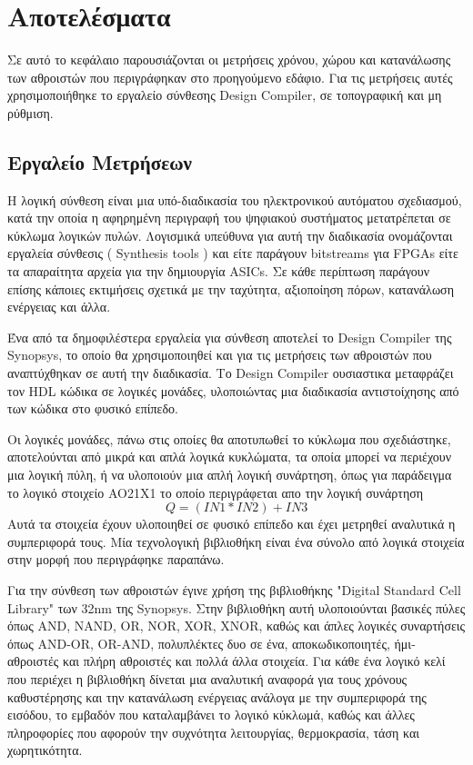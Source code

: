 \section{Αποτελέσματα}

Σε αυτό το κεφάλαιο παρουσιάζονται οι μετρήσεις χρόνου, χώρου και κατανάλωσης των αθροιστών 
που περιγράφηκαν στο προηγούμενο εδάφιο. Για τις μετρήσεις αυτές χρησιμοποιήθηκε το εργαλείο
σύνθεσης Design Compiler, σε τοπογραφική και μη ρύθμιση.


\subsection{Εργαλείο Μετρήσεων}

Η λογική σύνθεση είναι μια υπό-διαδικασία του ηλεκτρονικού αυτόματου σχεδιασμού,
κατά την οποία η αφηρημένη περιγραφή του ψηφιακού συστήματος 
μετατρέπεται σε κύκλωμα λογικών πυλών. Λογισμικά υπεύθυνα για αυτή την διαδικασία
ονομάζονται εργαλεία σύνθεσις ( Synthesis tools ) και είτε παράγουν bitstreams για FPGAs
είτε τα απαραίτητα αρχεία για την δημιουργία ASICs. Σε κάθε περίπτωση παράγουν
επίσης κάποιες εκτιμήσεις σχετικά με την ταχύτητα, αξιοποίηση πόρων, κατανάλωση ενέργειας
και άλλα.

Ένα από τα δημοφιλέστερα εργαλεία για σύνθεση αποτελεί το Design Compiler της Synopsys,
το οποίο θα χρησιμοποιηθεί και για τις μετρήσεις των αθροιστών που αναπτύχθηκαν σε
αυτή την διαδικασία. Το Design Compiler ουσιαστικα μεταφράζει τον HDL κώδικα σε λογικές
μονάδες, υλοποιώντας μια διαδικασία αντιστοίχησης από των κώδικα στο φυσικό επίπεδο.

Οι λογικές μονάδες, πάνω στις οποίες θα αποτυπωθεί το κύκλωμα που σχεδιάστηκε, 
αποτελούνται από μικρά και απλά λογικά κυκλώματα, τα οποία μπορεί να περιέχουν 
μια λογική πύλη, ή να υλοποιούν μια απλή λογική συνάρτηση, όπως για παράδειγμα 
το λογικό στοιχείο AO21X1 το οποίο περιγράφεται απο την λογική συνάρτηση
\begin{equation*}
    Q = ( IN1 * IN2 ) + IN3
\end{equation*}
Αυτά τα στοιχεία έχουν υλοποιηθεί σε φυσικό επίπεδο και έχει μετρηθεί αναλυτικά η συμπεριφορά
τους. Μία τεχνολογική βιβλιοθήκη είναι ένα σύνολο από λογικά στοιχεία στην μορφή που περιγράφηκε
παραπάνω. 

Για την σύνθεση των αθροιστών έγινε χρήση της βιβλιοθήκης "Digital Standard Cell Library" 
των 32nm της Synopsys. Στην βιβλιοθήκη αυτή υλοποιούνται βασικές πύλες όπως AND, NAND, 
OR, NOR, XOR, XNOR, καθώς και άπλες λογικές συναρτήσεις όπως AND-OR, OR-AND, πολυπλέκτες 
δυο σε ένα, αποκωδικοποιητές, ήμι-αθροιστές και πλήρη αθροιστές και πολλά άλλα στοιχεία.
Για κάθε ένα λογικό κελί που περιέχει η βιβλιοθήκη δίνεται μια αναλυτική αναφορά
για τους χρόνους καθυστέρησης και την κατανάλωση ενέργειας ανάλογα με την συμπεριφορά της εισόδου,
το εμβαδόν που καταλαμβάνει το λογικό κύκλωμά, καθώς και άλλες πληροφορίες που αφορούν την 
συχνότητα λειτουργίας, θερμοκρασία, τάση και χωρητικότητα.



